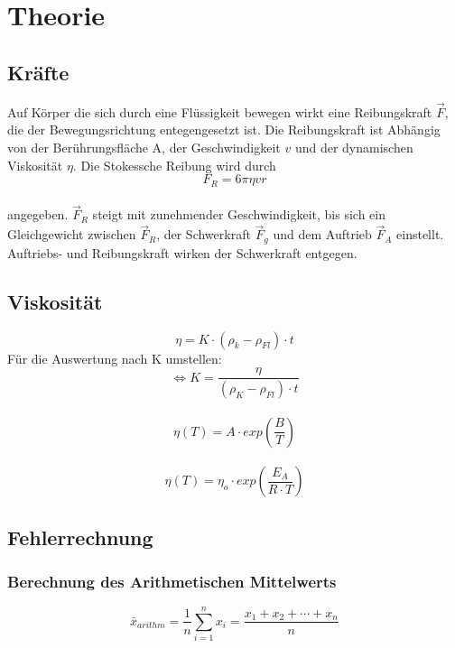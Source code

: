 \section{Theorie}
\label{sec:Theorie}

\subsection{Kräfte}
Auf Körper die sich durch eine Flüssigkeit bewegen wirkt eine Reibungskraft $\vec{F}$,
die der Bewegungsrichtung entegengesetzt ist. Die Reibungskraft ist Abhängig von der Berührungsfläche A,
der Geschwindigkeit $v$ und der dynamischen Viskosität $η$.
Die Stokessche Reibung wird durch 
\\
\begin{equation}
    F_{R} = 6πηvr
\end{equation}
\\
angegeben. $\vec{F}_R$ steigt mit zunehmender Geschwindigkeit, bis sich ein Gleichgewicht zwischen $\vec{F}_R$, der Schwerkraft $\vec{F}_g$ 
und dem Auftrieb $\vec{F}_A$ einstellt. Auftriebs- und Reibungskraft wirken der Schwerkraft entgegen.
\\
\subsection{Viskosität}
\begin{equation}
    η = K \cdot (ρ_k - ρ_{Fl}) \cdot t
\end{equation}
Für die Auswertung nach K umstellen:
\begin{equation} \label{eq:K}
    \Leftrightarrow K = \frac{η}{(ρ_K - ρ_{Fl}) \cdot t}
\end{equation}
\\
\begin{equation}
η(T) = A \cdot exp \left(\frac{B}{T}\right)
\label{eqn:AndradscheGl}
\end{equation}
\\
\begin{equation}
η(T) = η_o \cdot exp \left(\frac{E_A}{R\cdot T}\right)
\end{equation}

\subsection{Fehlerrechnung}

\subsubsection{Berechnung des Arithmetischen Mittelwerts}
\begin{equation}
    \bar{x}_{arithm} = \frac{1}{n}  \sum_{i=1}^n x_i = \frac{x_1 + x_2 + \cdots + x_n}{n}
    \label{eqn:arithmetischesmittel}
\end{equation}

